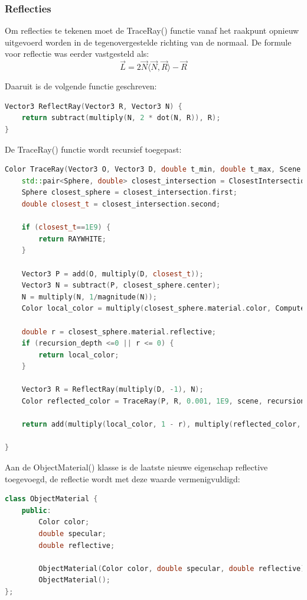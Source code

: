 \documentclass[12pt, a4paper]{article}
\begin{document}
\subsubsection{Reflecties}

Om reflecties te tekenen moet de TraceRay() functie vanaf het raakpunt opnieuw uitgevoerd worden in de tegenovergestelde richting van de normaal. De formule voor reflectie was eerder vastgesteld als:
\[\vec{L}=2\vec{N}\langle\vec{N},\vec{R}\rangle-\vec{R}\]

Daaruit is de volgende functie geschreven:

\begin{lstlisting}[language=C++]
Vector3 ReflectRay(Vector3 R, Vector3 N) {
    return subtract(multiply(N, 2 * dot(N, R)), R);
}
\end{lstlisting}

De TraceRay() functie wordt recursief toegepast:
\begin{lstlisting}[language=C++]
Color TraceRay(Vector3 O, Vector3 D, double t_min, double t_max, Scene scene, int recursion_depth) {   
    std::pair<Sphere, double> closest_intersection = ClosestIntersection(O, D, t_min, t_max, scene);
    Sphere closest_sphere = closest_intersection.first;
    double closest_t = closest_intersection.second;

    if (closest_t==1E9) {
        return RAYWHITE;
    }

    Vector3 P = add(O, multiply(D, closest_t));
    Vector3 N = subtract(P, closest_sphere.center);
    N = multiply(N, 1/magnitude(N));
    Color local_color = multiply(closest_sphere.material.color, ComputeLighting(P, N, multiply(D, -1), closest_sphere.material.specular, scene));

    double r = closest_sphere.material.reflective;
    if (recursion_depth <=0 || r <= 0) {
        return local_color;
    }

    Vector3 R = ReflectRay(multiply(D, -1), N);
    Color reflected_color = TraceRay(P, R, 0.001, 1E9, scene, recursion_depth - 1);

    return add(multiply(local_color, 1 - r), multiply(reflected_color, r)); 

}
\end{lstlisting}

Aan de ObjectMaterial() klasse is de laatste nieuwe eigenschap reflective toegevoegd, de reflectie wordt met deze waarde vermenigvuldigd:

\begin{lstlisting}[language=C++]
class ObjectMaterial {
    public: 
        Color color;
        double specular;
        double reflective;

        ObjectMaterial(Color color, double specular, double reflective);
        ObjectMaterial();
};
\end{lstlisting}
\end{document}
